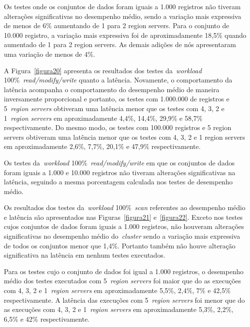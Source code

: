 \documentclass[12pt]{article}
\begin{document}
Os testes onde os conjuntos de dados foram iguais a 1.000 registros não tiveram alterações significativas no desempenho médio, sendo a variação mais expressiva de menos de 6\% aumentando de 1 para 2 region servers. Para o conjunto de 10.000 registro, a variação mais expressiva foi de aproximadamente 18,5\% quando aumentado de 1 para 2 region servers. As demais adições de nós apresentaram uma variação de menos de 4\%.

A Figura~\ref{figura20} apresenta os resultados dos testes da~\emph{workload} 100\%~\emph{read/modify/write} quanto a latência. Novamente, o comportamento da latência acompanha o comportamento do desempenho médio de maneira inversamente proporcional e portanto, os testes com 1.000.000 de registros e 5~\emph{region servers} obtiveram uma latência menor que os testes com 4, 3, 2 e 1~\emph{region servers} em aproximadamente 4,4\%, 14,4\%, 29,9\% e 58,7\% respectivamente. 
Do mesmo modo, os testes com 100.000 registros e 5 region servers obtiveram uma latência menor que os testes com 4, 3, 2 e 1 region servers em aproximadamente 2,6\%, 7,7\%, 20,1\% e 47,9\% respectivamente.

Os testes da~\emph{workload} 100\%~\emph{read/modify/write} em que os conjuntos de dados foram iguais a 1.000 e 10.000 registros não tiveram alterações significativas na latência, seguindo a mesma porcentagem calculada nos testes de desempenho médio.

Os resultados dos testes da~\emph{workload} 100\%~\emph{scan} referentes ao desempenho médio e latência são apresentados nas Figuras~\ref{figura21} e~\ref{figura22}. 
Exceto nos testes cujos conjuntos de dados foram iguais a 1.000 registros, não houveram alterações significativas no desempenho médio do~\emph{cluster}  sendo a variação mais expressiva de todos os conjuntos menor que 1,4\%. 
Portanto também não houve alteração significativa na latência em nenhum testes executados.

Para os testes cujo o conjunto de dados foi igual a 1.000 registros, o desempenho médio dos testes executados com 5~\emph{region servers} foi maior que do as execuções com 4, 3, 2 e 1~\emph{region servers} em aproximadamente 5,5\%, 2,4\%, 7\% e 42,5\% respectivamente.
A latência das execuções com 5~\emph{region servers} foi menor que do as execuções com 4, 3, 2 e 1~\emph{region servers} em aproximadamente 5,3\%, 2,2\%, 6,5\% e 42\% respectivamente.
\end{document}
